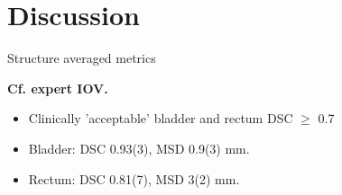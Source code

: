 \documentclass[9pt]{beamer}
\begin{document}
\section{Discussion}
\begin{frame}{Structure averaged metrics}



\vspace{4mm}
\textbf{Cf. expert IOV.}\footnotemark[1]
\begin{itemize}
\item Clinically 'acceptable' bladder and rectum DSC $\geq$ 0.7
\item Bladder:  DSC 0.93(3), MSD 0.9(3) mm.
\item Rectum:  DSC 0.81(7), MSD 3(2) mm.
\end{itemize}
\vspace{2mm}
\end{frame}
%
%
%

\end{document}
